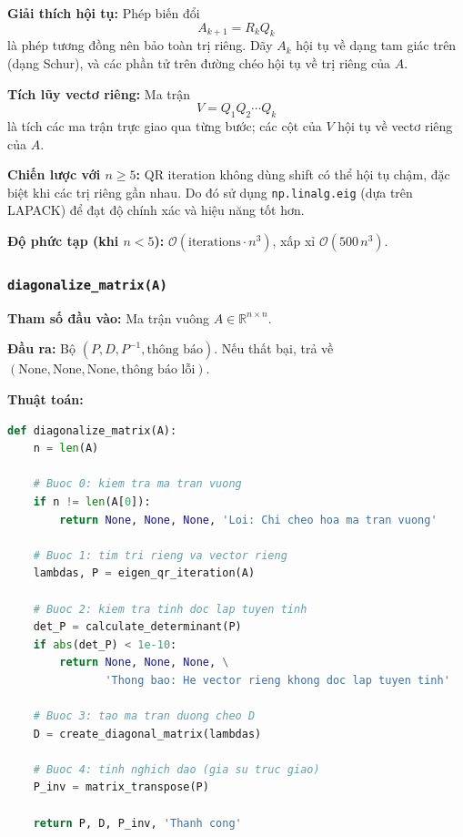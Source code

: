\documentclass[a4paper,12pt]{report}
\begin{document}
\textbf{Giải thích hội tụ:} Phép biến đổi
\[
  A_{k+1} = R_k Q_k
\]
là phép tương đồng nên bảo toàn trị riêng. Dãy $A_k$ hội tụ về dạng tam giác trên (dạng Schur), và các phần tử trên đường chéo hội tụ về trị riêng của $A$.

\smallskip

\textbf{Tích lũy vectơ riêng:} Ma trận
\[
  V = Q_1 Q_2 \cdots Q_k
\]
là tích các ma trận trực giao qua từng bước; các cột của $V$ hội tụ về vectơ riêng của $A$.

\smallskip

\textbf{Chiến lược với $n \geq 5$:} QR iteration không dùng shift có thể hội tụ chậm, đặc biệt khi các trị riêng gần nhau. Do đó sử dụng \texttt{np.linalg.eig} (dựa trên LAPACK) để đạt độ chính xác và hiệu năng tốt hơn.

\smallskip

\textbf{Độ phức tạp (khi $n < 5$):} $\mathcal{O}(\text{iterations} \cdot n^3)$, xấp xỉ $\mathcal{O}(500\, n^3)$.

\subsubsection*{\texttt{diagonalize\_matrix(A)}}

\smallskip

\textbf{Tham số đầu vào:} Ma trận vuông $A \in \mathbb{R}^{n \times n}$.

\smallskip

\textbf{Đầu ra:} Bộ $(P, D, P^{-1}, \text{thông báo})$. Nếu thất bại, trả về $(\text{None}, \text{None}, \text{None}, \text{thông báo lỗi})$.

\smallskip

\textbf{Thuật toán:}

\begin{lstlisting}[language=Python, caption={Chéo hóa ma trận}]
def diagonalize_matrix(A):
    n = len(A)

    # Buoc 0: kiem tra ma tran vuong
    if n != len(A[0]):
        return None, None, None, 'Loi: Chi cheo hoa ma tran vuong'

    # Buoc 1: tim tri rieng va vector rieng
    lambdas, P = eigen_qr_iteration(A)

    # Buoc 2: kiem tra tinh doc lap tuyen tinh
    det_P = calculate_determinant(P)
    if abs(det_P) < 1e-10:
        return None, None, None, \
               'Thong bao: He vector rieng khong doc lap tuyen tinh'

    # Buoc 3: tao ma tran duong cheo D
    D = create_diagonal_matrix(lambdas)

    # Buoc 4: tinh nghich dao (gia su truc giao)
    P_inv = matrix_transpose(P)

    return P, D, P_inv, 'Thanh cong'
\end{lstlisting}
\end{document}
